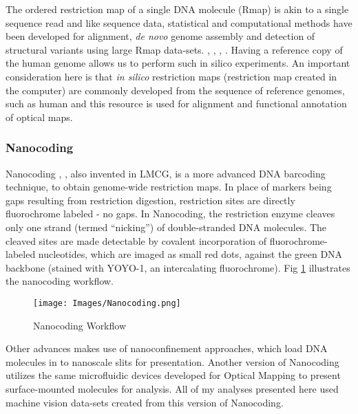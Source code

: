 The ordered restriction map of a single DNA molecule (Rmap) is akin to a single sequence read and like sequence data, statistical and computational methods have been developed for alignment, {\emph{de novo}} genome assembly and detection of structural variants using large Rmap data-sets. \cite{Valouev_etal_2006_JCB}, \cite{Valouev_etal_2006_PNAS}, \cite{Valouev_etal_2006_BioInfo}, \cite{Sarkar_etal_2012_JCB}. Having a reference copy of the human genome allows us to perform such in silico experiments. An important consideration here is that {\emph{in silico}} restriction maps (restriction map created in the computer) are commonly developed from the sequence of reference genomes, such as human and this resource is used for alignment and functional annotation of optical maps.

\subsubsection*{Nanocoding}
Nanocoding \cite{Jo_etal_2007_PNAS}, \cite{Jo_etal_2009}, also invented in LMCG, is a more advanced DNA barcoding technique, to obtain genome-wide restriction maps. In place of markers being gaps resulting from restriction digestion, restriction sites are directly fluorochrome labeled - no gaps. In Nanocoding, the restriction enzyme cleaves only one strand (termed ``nicking'') of double-stranded DNA molecules. The cleaved sites are made detectable by covalent incorporation of fluorochrome-labeled nucleotides, which are imaged as small red dots, against the green DNA backbone (stained with YOYO-1, an intercalating fluorochrome). Fig \ref{fig:Nanocoding} illustrates the nanocoding workflow. 

\begin{figure}[H]
\begin{center}
\texttt{[image: Images/Nanocoding.png]}
\end{center}
\caption{Nanocoding Workflow}
\label{fig:Nanocoding}
\end{figure}

Other advances makes use of nanoconfinement approaches, which load DNA molecules in to nanoscale slits for presentation. Another version of Nanocoding utilizes the same microfluidic devices developed
for Optical Mapping to present surface-mounted molecules for analysis. All of my analyses presented here used machine vision data-sets created from this version of Nanocoding.

